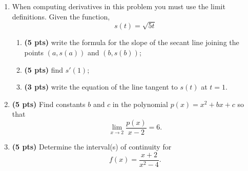 \documentclass[12pt]{article}
\begin{document}
\begin{enumerate}
\newpage
\item When computing derivatives in this problem you must use the limit definitions.  Given the function,
\[s(t)=\sqrt{5t}\]
	\begin{enumerate}
	\item {\bf (5 pts)} write the formula for the slope of the secant line joining the points $(a,s(a))$ and $(b,s(b))$;
	\vspace{14pc}
	
	\item {\bf (5 pts)} find $s'(1)$;
	\vspace{14pc}
	
	\item {\bf (3 pts)} write the equation of the line tangent to $s(t)$ at $t=1$.
	\end{enumerate}
	
\newpage
\item {\bf (5 pts)} Find constants $b$ and $c$ in the polynomial $p(x)=x^2+bx+c$ so that 
\[
\lim_{x\to 2}\frac{p(x)}{x-2}=6.
\]
\vspace{22pc}
\item {\bf (5 pts) } Determine the interval(s) of continuity for
\[f(x)=\frac{x+2}{x^2-4}.\]

\end{enumerate}
\end{document}
